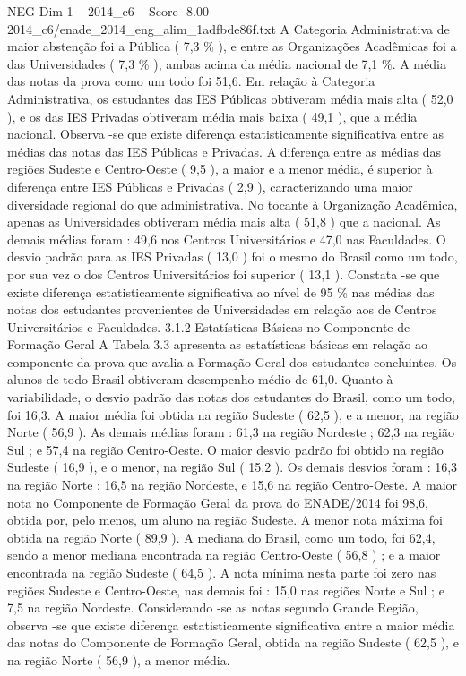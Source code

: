 \begin{textsample}{NEG Dim 1 – 2014\_c6 – Score -8.00 – 2014\_c6/enade\_2014\_eng\_alim\_1adfbde86f.txt}
A Categoria Administrativa de maior abstenção foi a Pública ( 7,3 \% ), e entre as Organizações Acadêmicas foi a das Universidades ( 7,3 \% ), ambas acima da média nacional de 7,1 \%.
A média das notas da prova como um todo foi 51,6.
Em relação à Categoria Administrativa, os estudantes das IES Públicas obtiveram média mais alta ( 52,0 ), e os das IES Privadas obtiveram média mais baixa ( 49,1 ), que a média nacional.
Observa -se que existe diferença estatisticamente significativa entre as médias das notas das IES Públicas e Privadas.
A diferença entre as médias das regiões Sudeste e Centro-Oeste ( 9,5 ), a maior e a menor média, é superior à diferença entre IES Públicas e Privadas ( 2,9 ), caracterizando uma maior diversidade regional do que administrativa.
No tocante à Organização Acadêmica, apenas as Universidades obtiveram média mais alta ( 51,8 ) que a nacional.
As demais médias foram : 49,6 nos Centros Universitários e 47,0 nas Faculdades.
O desvio padrão para as IES Privadas ( 13,0 ) foi o mesmo do Brasil como um todo, por sua vez o dos Centros Universitários foi superior ( 13,1 ).
Constata -se que existe diferença estatisticamente significativa ao nível de 95 \% nas médias das notas dos estudantes provenientes de Universidades em relação aos de Centros Universitários e Faculdades. 3.1.2 Estatísticas Básicas no Componente de Formação Geral A Tabela 3.3 apresenta as estatísticas básicas em relação ao componente da prova que avalia a Formação Geral dos estudantes concluintes.
Os alunos de todo Brasil obtiveram desempenho médio de 61,0.
Quanto à variabilidade, o desvio padrão das notas dos estudantes do Brasil, como um todo, foi 16,3.
A maior média foi obtida na região Sudeste ( 62,5 ), e a menor, na região Norte ( 56,9 ).
As demais médias foram : 61,3 na região Nordeste ; 62,3 na região Sul ; e 57,4 na região Centro-Oeste.
O maior desvio padrão foi obtido na região Sudeste ( 16,9 ), e o menor, na região Sul ( 15,2 ).
Os demais desvios foram : 16,3 na região Norte ; 16,5 na região Nordeste, e 15,6 na região Centro-Oeste.
A maior nota no Componente de Formação Geral da prova do ENADE/2014 foi 98,6, obtida por, pelo menos, um aluno na região Sudeste.
A menor nota máxima foi obtida na região Norte ( 89,9 ).
A mediana do Brasil, como um todo, foi 62,4, sendo a menor mediana encontrada na região Centro-Oeste ( 56,8 ) ; e a maior encontrada na região Sudeste ( 64,5 ).
A nota mínima nesta parte foi zero nas regiões Sudeste e Centro-Oeste, nas demais foi : 15,0 nas regiões Norte e Sul ; e 7,5 na região Nordeste.
Considerando -se as notas segundo Grande Região, observa -se que existe diferença estatisticamente significativa entre a maior média das notas do Componente de Formação Geral, obtida na região Sudeste ( 62,5 ), e na região Norte ( 56,9 ), a menor média.

\end{textsample}
